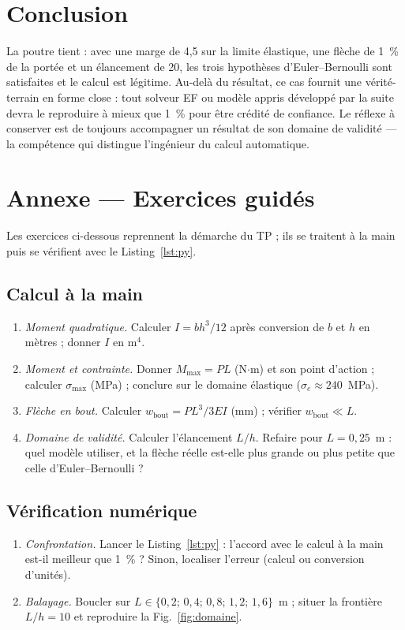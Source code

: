 \documentclass[10pt,journal]{IEEEtran}
\begin{document}
\section{Conclusion}
La poutre tient : avec une marge de 4,5 sur la limite élastique, une flèche de 1~\% de la portée et un élancement de 20, les trois hypothèses d'Euler--Bernoulli sont satisfaites et le calcul est légitime. Au-delà du résultat, ce cas fournit une vérité-terrain en forme close : tout solveur EF ou modèle appris développé par la suite devra le reproduire à mieux que 1~\% pour être crédité de confiance. Le réflexe à conserver est de toujours accompagner un résultat de son domaine de validité --- la compétence qui distingue l'ingénieur du calcul automatique.

\appendices
\section*{Annexe --- Exercices guidés}
Les exercices ci-dessous reprennent la démarche du TP ; ils se traitent à la main puis se vérifient avec le Listing~\ref{lst:py}.

\subsection{Calcul à la main}
\begin{enumerate}[leftmargin=1.4em]
\item \emph{Moment quadratique.} Calculer $I=bh^3/12$ après conversion de $b$ et $h$ en mètres ; donner $I$ en m$^4$.
\item \emph{Moment et contrainte.} Donner $M_{\max}=PL$ (N$\cdot$m) et son point d'action ; calculer $\sigma_{\max}$ (MPa) ; conclure sur le domaine élastique ($\sigma_e\approx 240$~MPa).
\item \emph{Flèche en bout.} Calculer $w_{\text{bout}}=PL^3/3EI$ (mm) ; vérifier $w_{\text{bout}}\ll L$.
\item \emph{Domaine de validité.} Calculer l'élancement $L/h$. Refaire pour $L=0{,}25$~m : quel modèle utiliser, et la flèche réelle est-elle plus grande ou plus petite que celle d'Euler--Bernoulli ?
\end{enumerate}

\subsection{Vérification numérique}
\begin{enumerate}[leftmargin=1.4em]
\item \emph{Confrontation.} Lancer le Listing~\ref{lst:py} : l'accord avec le calcul à la main est-il meilleur que 1~\% ? Sinon, localiser l'erreur (calcul ou conversion d'unités).
\item \emph{Balayage.} Boucler sur $L\in\{0{,}2;\,0{,}4;\,0{,}8;\,1{,}2;\,1{,}6\}$~m ; situer la frontière $L/h=10$ et reproduire la Fig.~\ref{fig:domaine}.
\end{enumerate}
\end{document}
